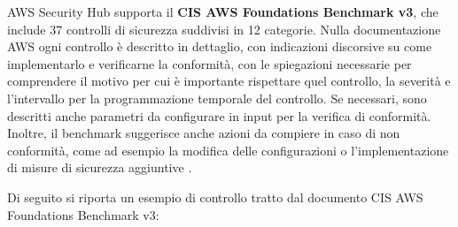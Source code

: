 AWS Security Hub supporta il \textbf{CIS AWS Foundations Benchmark v3}, che include 37 controlli di sicurezza suddivisi in 12 categorie. Nulla documentazione AWS ogni controllo è descritto in dettaglio, con indicazioni discorsive su come implementarlo e verificarne la conformità, con le spiegazioni necessarie per comprendere il motivo per cui è importante rispettare quel controllo, la severità e l'intervallo per la programmazione temporale del controllo. Se necessari, sono descritti anche parametri da configurare in input per la verifica di conformità. Inoltre, il benchmark suggerisce anche azioni da compiere in caso di non conformità, come ad esempio la modifica delle configurazioni o l'implementazione di misure di sicurezza aggiuntive \cite{cisawsbenchmarkv3}.

Di seguito si riporta un esempio di controllo tratto dal documento CIS AWS Foundations Benchmark v3:

